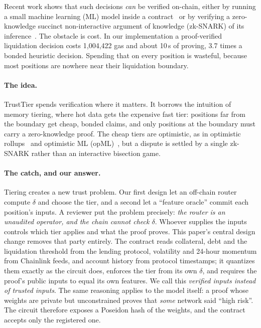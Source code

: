 \documentclass[sigconf,nonacm]{acmart}
\begin{document}
Recent work shows that such decisions \emph{can} be verified on-chain, either by running a small machine learning (ML) model inside a contract~\cite{alhaidari2025onchain} or by verifying a zero-knowledge succinct non-interactive argument of knowledge (zk-SNARK) of its inference~\cite{chen2024zkml,kang2022scaling}. The obstacle is cost. In our implementation a proof-verified liquidation decision costs 1,004,422 gas and about 10\,s of proving, 3.7 times a bonded heuristic decision. Spending that on every position is wasteful, because most positions are nowhere near their liquidation boundary.

\paragraph{The idea.} TrustTier spends verification where it matters. It borrows the intuition of memory tiering, where hot data gets the expensive fast tier: positions far from the boundary get cheap, bonded claims, and only positions at the boundary must carry a zero-knowledge proof. The cheap tiers are optimistic, as in optimistic rollups~\cite{kalodner2018arbitrum} and optimistic ML (opML)~\cite{conway2024opml}, but a dispute is settled by a single zk-SNARK rather than an interactive bisection game.

\paragraph{The catch, and our answer.} Tiering creates a new trust problem. Our first design let an off-chain router compute $\delta$ and choose the tier, and a second let a ``feature oracle'' commit each position's inputs. A reviewer put the problem precisely: \emph{the router is an unaudited operator, and the chain cannot check $\delta$}. Whoever supplies the inputs controls which tier applies and what the proof proves. This paper's central design change removes that party entirely. The contract reads collateral, debt and the liquidation threshold from the lending protocol, volatility and 24-hour momentum from Chainlink feeds, and account history from protocol timestamps; it quantizes them exactly as the circuit does, enforces the tier from its own $\delta$, and requires the proof's public inputs to equal its own features. We call this \emph{verified inputs instead of trusted inputs}. The same reasoning applies to the model itself: a proof whose weights are private but unconstrained proves that \emph{some} network said ``high risk''. The circuit therefore exposes a Poseidon hash of the weights, and the contract accepts only the registered one.
\end{document}
